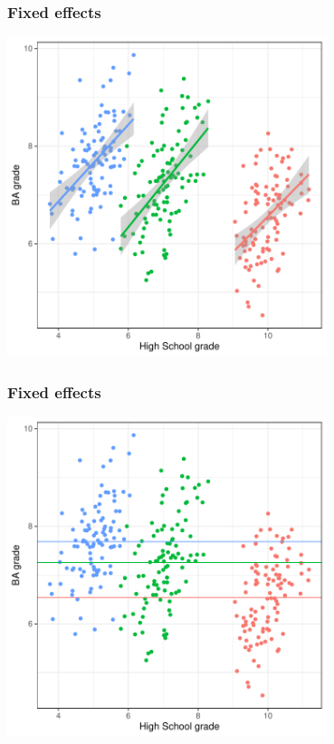 \documentclass[aspectratio=43]{beamer}
\begin{document}
\begin{frame}
\frametitle{Fixed effects}
\centering

\includegraphics[width = 0.7\textwidth]{../img/fe4}

\end{frame}

\begin{frame}
\frametitle{Fixed effects}
\centering

\includegraphics[width = 0.7\textwidth]{../img/fe5}

\end{frame}
\end{document}
